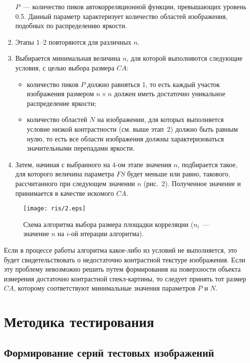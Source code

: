 \documentclass[a4paper]{jctart10}
\begin{document}
\begin{enumerate}
$P$~--- количество пиков автокорреляционной функции, превышающих уровень 0.5. Данный параметр характеризует количество областей изображения, подобных по распределению яркости.
\item Этапы 1–2 повторяются для различных $n$.
\item Выбирается минимальная величина $n$, для которой выполняются следующие условия, с целью выбора размера $CA$:
\begin{itemize}
	\item количество пиков $P$ должно равняться 1, то есть каждый участок изображения размером $n \times n$ должен иметь достаточно уникальное распределение яркости;
	\item количество областей $N$ на изображении, для которых выполняется условие низкой контрастности (см. выше этап~2) должно быть равным нулю, то есть все области изображения должны характеризоваться значительными перепадами яркости.
\end{itemize}
\item Затем, начиная с выбранного на 4-ом этапе значения $n$, подбирается такое, для которого величина параметра $FS$ будет меньше или равно, такового, рассчитанного при следующем значении $n$ (рис.~2). Полученное значение и принимается в качестве искомого $CA$.
\end{enumerate}
\begin{figure}[b!]
    \centering
    \texttt{[image: ris/2.eps]}\\
    \caption{Схема алгоритма выбора размера площадки корреляции ($n_{i}$~--- значение $n$ на $i$-ой итерации алгоритма).}
\end{figure}
Если в процессе работы алгоритма какое-либо из условий не выполняется, это будет свидетельствовать о недостаточно контрастной текстуре изображения. Если эту проблему невозможно решить путем формирования на поверхности объекта измерения достаточно контрастной спекл-картины, то следует принять тот размер $CA$, которому соответствуют минимальные значения параметров $P$ и $N$.

\section{Методика тестирования}

\subsection{Формирование серий тестовых изображений}
\end{document}
